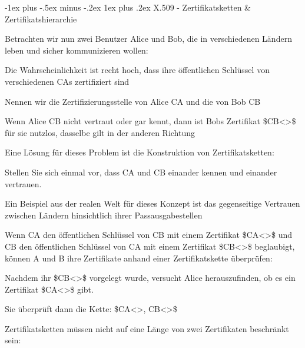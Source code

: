 \documentclass[a4paper]{article}
\makeatletter
\renewcommand{\subsubsection}{\@startsection{subsubsection}{3}{0mm}%
 {-1ex plus -.5ex minus -.2ex}%
 {1ex plus .2ex}%
 {\normalfont\small\bfseries}}
\makeatother
\begin{document}
\begin{multicols}{3}
      \subsubsection{X.509 - Zertifikatsketten \&
            Zertifikatshierarchie}

      \begin{itemize*}
            \item
            Betrachten wir nun zwei Benutzer Alice und Bob, die in verschiedenen
            Ländern leben und sicher kommunizieren wollen:

            \begin{itemize*}
                  \item Die Wahrscheinlichkeit ist recht hoch, dass ihre öffentlichen Schlüssel von verschiedenen CAs zertifiziert sind
                  \item Nennen wir die Zertifizierungsstelle von Alice CA und die von Bob CB
                  \item Wenn Alice CB nicht vertraut oder gar kennt, dann ist Bobs Zertifikat \$CB\textless{}\textgreater\$ für sie nutzlos, dasselbe gilt in der anderen Richtung
            \end{itemize*}
            \item
            Eine Lösung für dieses Problem ist die Konstruktion von
            Zertifikatsketten:

            \begin{itemize*}
                  \item Stellen Sie sich einmal vor, dass CA und CB einander kennen und einander vertrauen.
                  \begin{itemize*} \item Ein Beispiel aus der realen Welt für dieses Konzept ist das gegenseitige Vertrauen zwischen Ländern hinsichtlich ihrer Passausgabestellen \end{itemize*}
                  \item Wenn CA den öffentlichen Schlüssel von CB mit einem Zertifikat \$CA\textless{}\textgreater\$ und CB den öffentlichen Schlüssel von CA mit einem Zertifikat \$CB\textless{}\textgreater\$ beglaubigt, können A und B ihre Zertifikate anhand einer Zertifikatskette überprüfen:
                  \begin{itemize*} \item Nachdem ihr \$CB\textless{}\textgreater\$ vorgelegt wurde, versucht Alice herauszufinden, ob es ein Zertifikat \$CA\textless{}\textgreater\$ gibt. \item Sie überprüft dann die Kette: \$CA\textless{}\textgreater, CB\textless{}\textgreater\$ \end{itemize*}
            \end{itemize*}
            \item
            Zertifikatsketten müssen nicht auf eine Länge von zwei Zertifikaten
            beschränkt sein:


\end{itemize*}
\end{multicols}
\end{document}
